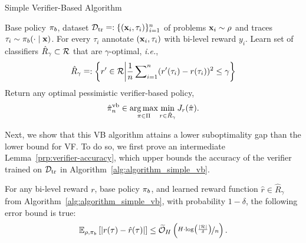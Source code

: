 \begin{algorithm}[ht]
\caption{Simple Verifier-Based Algorithm}
\label{alg:algorithm_simple_vb}
\begin{algorithmic}[1]
\REQUIRE Base policy $\pi_b$, dataset ${\mathcal{D}}_\mathrm{tr} \mathrel{\mathop=}:\{(\mathbf{x}_i, \tau_i)\}_{i=1}^n$ of problems $\mathbf{x}_i \sim \rho$ and traces $\tau_i \sim \pi_b(\cdot \mid \mathbf{x})$.
\STATE For every $\tau_i$  annotate $(\mathbf{x}_i, \tau_i)$ with bi-level reward $y_i$. %
\STATE Learn set of classifiers $\hat{R}_\gamma \subset {\mathcal{R}}$ that are $\gamma$-optimal, \textit{i.e.}, 
{
\begin{align*}
    \vspace{-0.1cm}
    \setlength{\abovedisplayskip}{6pt}
    \setlength{\belowdisplayskip}{6pt}
    \hat{R}_\gamma \eqdef \cbrck{r' \in \gR \middle| \frac{1}{n}\sum\nolimits_{i=1}^n (r'(\tau_i) - r(\tau_i))^2 \leq \gamma}
\end{align*}
}\STATE Return any optimal pessimistic verifier-based policy,
{
\begin{align*}
    \setlength{\abovedisplayskip}{6pt}
    \setlength{\belowdisplayskip}{6pt}
    \hat{\pi}^\mathrm{vb}_n \in \argmax_{\pi \in \Pi} \min_{r \in \hat{R}_\gamma} J_r(\hat{\pi}).
\end{align*}}
\vspace{-0.15cm}
\end{algorithmic}
\end{algorithm}
Next, we show that this VB algorithm attains a lower suboptimality gap than the lower bound for VF. To do so, we first prove an intermediate Lemma~\ref{prp:verifier-accuracy}, which upper bounds the accuracy of the verifier trained on ${\mathcal{D}}_\mathrm{tr}$ in Algorithm~\ref{alg:algorithm_simple_vb}. 
\begin{proposition}
    \label{prp:verifier-accuracy}
    For any bi-level reward $r$, base policy $\pi_b$, 
    and learned reward function $\hat r \in \hat{R}_\gamma$ from Algorithm~\ref{alg:algorithm_simple_vb}, with probability $1-\delta$, the following error bound is true:  
    {
    \setlength{\abovedisplayskip}{3pt}
    \setlength{\belowdisplayskip}{0pt}
    \begin{align*}
        \mathbb{E}_{\rho,\pi_b} \left[|r(\tau) - \hat{r}(\tau)|\right] \le  \widetilde{{\mathcal{O}}}_H\left( \nicefrac{H \cdot \log
        \left( \frac{|{\mathcal{R}}|}{\delta} \right)}{n} \right). 
    \end{align*}
    }
\end{proposition}
